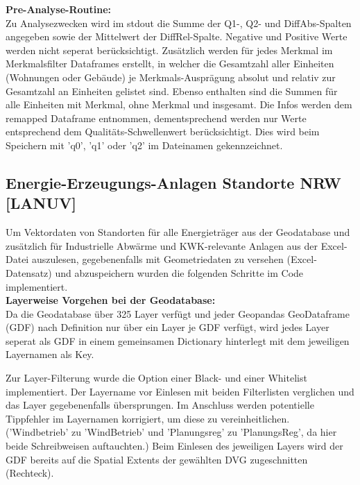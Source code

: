 				\textbf{Pre-Analyse-Routine:}\\
				Zu Analysezwecken wird im stdout die Summe der Q1-, Q2- und DiffAbs-Spalten angegeben sowie der Mittelwert der DiffRel-Spalte. Negative und Positive Werte werden nicht seperat berücksichtigt. Zusätzlich werden für jedes Merkmal im Merkmalsfilter Dataframes erstellt, in welcher die Gesamtzahl aller Einheiten (Wohnungen oder Gebäude) je Merkmals-Ausprägung absolut und relativ zur Gesamtzahl an Einheiten gelistet sind. Ebenso enthalten sind die Summen für alle Einheiten mit Merkmal, ohne Merkmal und insgesamt. Die Infos werden dem remapped Dataframe entnommen, dementsprechend werden nur Werte entsprechend dem Qualitäts-Schwellenwert berücksichtigt. Dies wird beim Speichern mit 'q0', 'q1' oder 'q2' im Dateinamen gekennzeichnet. 
				
				
		\subsection{Energie-Erzeugungs-Anlagen Standorte NRW [LANUV]}
		\label{sec:Code:Implementation1:EENNRW}
			Um Vektordaten von Standorten für alle Energieträger aus der Geodatabase und zusätzlich für Industrielle Abwärme und KWK-relevante Anlagen aus der Excel-Datei auszulesen, gegebenenfalls mit Geometriedaten zu versehen (Excel-Datensatz) und abzuspeichern wurden die folgenden Schritte im Code implementiert.\\
			
			\textbf{Layerweise Vorgehen bei der Geodatabase:}\\
			Da die Geodatabase über 325 Layer verfügt und jeder Geopandas GeoDataframe (GDF) nach Definition nur über ein Layer je GDF verfügt, wird jedes Layer seperat als GDF in einem gemeinsamen Dictionary hinterlegt mit dem jeweiligen Layernamen als Key. 
			
			Zur Layer-Filterung wurde die Option einer Black- und einer Whitelist implementiert. Der Layername vor Einlesen mit beiden Filterlisten verglichen und das Layer gegebenenfalls übersprungen. Im Anschluss werden potentielle Tippfehler im Layernamen korrigiert, um diese zu vereinheitlichen. ('Windbetrieb' zu 'WindBetrieb' und 'Planungsreg' zu 'PlanungsReg', da hier beide Schreibweisen auftauchten.) Beim Einlesen des jeweiligen Layers wird der GDF bereits auf die Spatial Extents der gewählten DVG zugeschnitten (Rechteck). 
			
